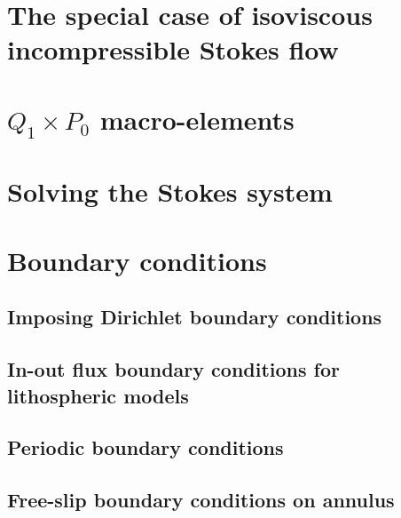 \newpage %
\section{The special case of isoviscous incompressible Stokes flow}\label{ss:isovisc}  

\newpage %
\section{$Q_1\times P_0$ macro-elements} \label{ss:meshtopos}  %

\newpage %
\section{Solving the Stokes system \label{sec:solvers}}  %

\newpage %
\section{Boundary conditions}
\subsection{Imposing Dirichlet boundary conditions \label{ss:howtobc}}  %
\newpage %
\subsection{In-out flux boundary conditions for lithospheric models}\label{kin_bc}  
\newpage %
\subsection{Periodic boundary conditions\label{ss_periodic}} %
\newpage %
\subsection{Free-slip boundary conditions on annulus}\label{ss:fsbc_annulus} %

